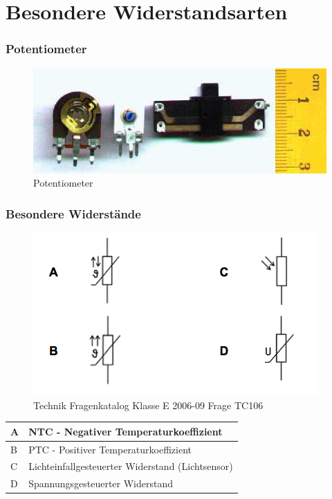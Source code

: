 \section*{Besondere Widerstandsarten}
\begin{frame}
  \frametitle{Potentiometer}

  \begin{center}
    \begin{figure}
      \includegraphics[width=\textwidth,height=.75\textheight,keepaspectratio]{e04/Potenziometer.jpg}
      \caption{Potentiometer \cite{potentiometer}}
      \label{fig_potentiometer}
    \end{figure}
  \end{center}

\end{frame}

\begin{frame}
  \frametitle{Besondere Widerstände}

  \begin{center}
    \begin{figure}
      \includegraphics[width=.6\textwidth,height=.5\textheight,keepaspectratio]{e04/bild-TC106.png}
      \caption{Technik Fragenkatalog Klasse E 2006-09 Frage TC106}
    \end{figure}

    \begin{tabular}{l||l}\hline
      A & NTC - Negativer Temperaturkoeffizient \\ \hline
      B & PTC - Positiver Temperaturkoeffizient \\ \hline
      C & Lichteinfallgesteuerter Widerstand (Lichtsensor) \\ \hline
      D & Spannungsgesteuerter Widerstand \\ \hline
    \end{tabular}
  \end{center}
\end{frame}


